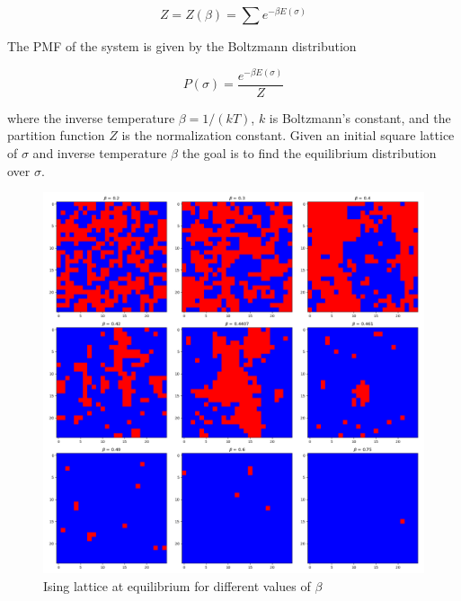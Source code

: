 \documentclass{article}
\begin{document}
\begin{equation}
    Z = Z(\beta) = \sum e^{-\beta E(\sigma)}
\end{equation}

The PMF of the system is given by the Boltzmann distribution

\begin{equation}
    P(\sigma) = \frac{e^{-\beta E(\sigma)}}{Z}
\end{equation}

where the inverse temperature $\beta = 1/(kT)$, $k$ is Boltzmann's constant, and the partition function $Z$ is the normalization constant.
Given an initial square lattice of $\sigma$ and inverse temperature $\beta$ the goal is to find the equilibrium distribution over $\sigma$.

\begin{figure}[ht]
    \centering
    \includegraphics[scale = 0.39]{diagrams/multiple_lattices.png}
    \caption{Ising lattice at equilibrium for different values of $\beta$}
    \label{fig:6}
\end{figure}
\end{document}
